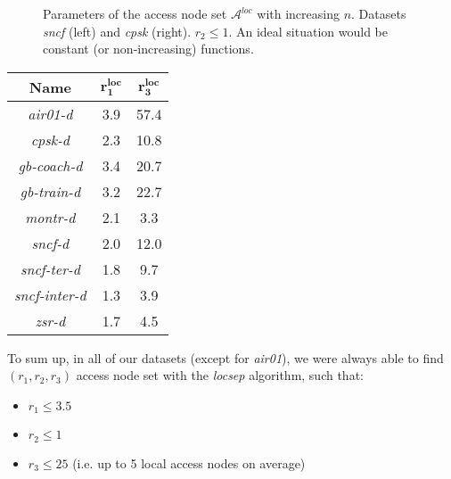 		\begin{figure}[h!]
		\centering
	    \caption{\label{plot:locsep-size} Parameters of the access node set $\mathcal{A}^{loc}$ with increasing $n$. Datasets \textit{sncf} (left) and \textit{cpsk} (right). $r_{2} \leq 1$. An ideal situation would be constant (or non-increasing) functions.}
		\end{figure}	
		
		\begin{table}[H]
			\centering 
			\begin{tabular}{c|c|c}
				\rowcolor{tablehead}
				\textbf{Name} & $\bm{r^{loc}_{1}}$ & $\bm{r^{loc}_{3}}$ \\
				\hline
				\textit{air01-d} & 3.9 & 57.4 \\
				\textit{cpsk-d} & 2.3 & 10.8 \\
				\textit{gb-coach-d} & 3.4 & 20.7 \\
				\textit{gb-train-d} & 3.2 & 22.7 \\
				\textit{montr-d} & 2.1 & 3.3 \\
				\textit{sncf-d} & 2.0 & 12.0 \\
				\textit{sncf-ter-d} & 1.8 & 9.7 \\
				\textit{sncf-inter-d} & 1.3 & 3.9 \\
				\textit{zsr-d} & 1.7 & 4.5 \\
			\end{tabular}
			\label{tab:locsep}
		\end{table}					
		
		\noindent To sum up, in all of our datasets (except for \textit{air01}), we were always able to find $(r_{1}, r_{2}, r_{3})$ access node set with the \textit{locsep} algorithm, such that:
		\begin{itemize}
			\item $r_{1} \leq 3.5$
			\item $r_{2} \leq 1$
			\item $r_{3} \leq 25$ (i.e. up to 5 local access nodes on average)
		\end{itemize}
		\hspace*{\fill}		
		
